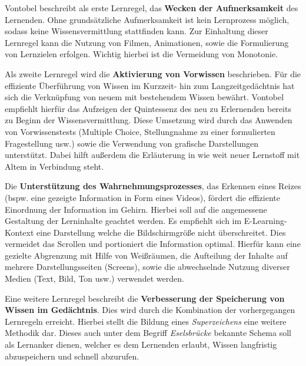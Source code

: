 Vontobel beschreibt als erste Lernregel, das \textbf{Wecken der Aufmerksamkeit} des Lernenden. Ohne grundsätzliche Aufmerksamkeit ist kein Lernprozess möglich, sodass keine Wissensvermittlung stattfinden kann. Zur Einhaltung dieser Lernregel kann die Nutzung von Filmen, Animationen, sowie die Formulierung von Lernzielen erfolgen. Wichtig hierbei ist die Vermeidung von Monotonie. \cite[S. 10f.]{Vontobel.2006} %

Als zweite Lernregel wird die \textbf{Aktivierung von Vorwissen} beschrieben. Für die effiziente Überführung von Wissen im Kurzzeit- hin zum Langzeitgedächtnis hat sich die Verknüpfung von neuem mit bestehendem Wissen bewährt. Vontobel empfiehlt hierfür das Aufzeigen der Quintessenz des neu zu Erlernenden bereits zu Beginn der Wissensvermittlung. Diese Umsetzung wird durch das Anwenden von Vorwissenstests (Multiple Choice, Stellungnahme zu einer formulierten Fragestellung usw.) sowie die Verwendung von grafische Darstellungen unterstützt. Dabei hilft außerdem die Erläuterung in wie weit neuer Lernstoff mit Altem in Verbindung steht. \cite[S. 11f.]{Vontobel.2006} %

Die \textbf{Unterstützung des Wahrnehmungsprozesses}, das Erkennen eines Reizes (bspw. eine gezeigte Information in Form eines Videos), fördert die effiziente Einordnung der Information im Gehirn. Hierbei soll auf die angemessene Gestaltung der Lerninhalte geachtet werden. Es empfiehlt sich im E-Learning-Kontext eine Darstellung welche die Bildschirmgröße nicht überschreitet. Dies vermeidet das Scrollen und portioniert die Information optimal. Hierfür kann eine gezielte Abgrenzung mit Hilfe von Weißräumen, die Aufteilung der Inhalte auf mehrere Darstellungsseiten (Screens), sowie die abwechselnde Nutzung diverser Medien (Text, Bild, Ton usw.) verwendet werden.\cite[S. 12f.]{Vontobel.2006} %

Eine weitere Lernregel beschreibt die \textbf{Verbesserung der Speicherung von Wissen im Gedächtnis}. Dies wird durch die Kombination der vorhergegangen Lernregeln erreicht. Hierbei stellt die Bildung eines \emph{Superzeichens} eine weitere Methodik dar. Dieses auch unter dem Begriff \emph{Eselsbrücke} bekannte Schema soll als Lernanker dienen, welcher es dem Lernenden erlaubt, Wissen langfristig abzuspeichern und schnell abzurufen. \cite[S.14]{Vontobel.2006}   
        
